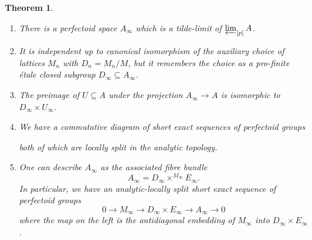 \documentclass[10pt,oneside]{amsart}
\newtheorem{theorem}{Theorem}[section]
\theoremstyle{definition}
\begin{document}
	\begin{theorem}\label{tilde-limit of tilde-limits of partial towers is tilde-limit of whole tower}
		\begin{enumerate}
		\item There is a perfectoid space  $A_\infty$ which is a tilde-limit of $\varprojlim_{[p]}A$.
		\item It is independent up to canonical isomorphism of the auxiliary choice of lattices $M_n$ with $D_n=M_n/M$, but it remembers the choice as a pro-finite \'etale closed subgroup $D_\infty \subseteq A_\infty$. 
		\item The preimage of $U\subseteq A$ under the projection $A_\infty \rightarrow A$ is isomorphic to $D_\infty \times U_\infty$. 
		
		\item 	We have a commutative diagram of short exact sequences of perfectoid groups		
		\begin{center}
		\end{center}
		both of which are locally split in the analytic topology.
		\item One can describe $A_\infty$ as the associated fibre bundle
		\[A_\infty = D_\infty\times^{M_\infty}E_\infty.\]
		In particular, we have an analytic-locally split short exact sequence of perfectoid groups
		\[0\rightarrow M_\infty\rightarrow D_\infty \times E_\infty \rightarrow A_\infty\rightarrow 0\]
		where the map on the left is the antidiagonal embedding of $M_\infty$ into $D_\infty\times E_\infty$.
		\end{enumerate}
	\end{theorem}
\end{document}
